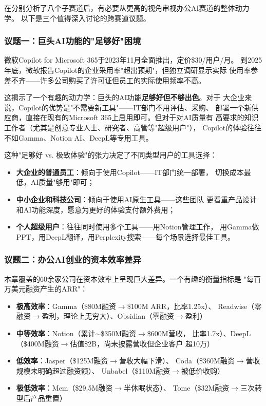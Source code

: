 在分别分析了八个子赛道后，有必要从更高的视角审视办公AI赛道的整体动力学。
以下是三个值得深入讨论的跨赛道议题。

\subsubsection{议题一：巨头AI功能的"足够好"困境}
微软Copilot for Microsoft 365于2023年11月全面推出，定价\$30/用户/月。
到2025年底，微软报告Copilot的企业采用率"超出预期"，但独立调研显示实际
使用率参差不齐——许多公司购买了许可证但员工的实际使用频率不高。

这揭示了一个有趣的动力学：巨头的AI功能\textbf{足够好但不够出色}。对于
大企业来说，Copilot的优势是"不需要新工具"——IT部门不用评估、采购、
部署一个新供应商，直接在现有的Microsoft 365上启用即可。但对于对AI质量有
高要求的知识工作者（尤其是创意专业人士、研究者、高管等"超级用户"），
Copilot的体验往往不如Gamma、Notion AI、DeepL等专用工具。

这种"足够好 vs. 极致体验"的张力决定了不同类型用户的工具选择：
\begin{itemize}
  \item \textbf{大企业的普通员工}：倾向于使用Copilot——IT部门统一部署，
    切换成本最低，AI质量"够用"即可；
  \item \textbf{中小企业和科技公司}：倾向于使用AI原生工具——这些团队
    更看重产品设计和AI功能深度，愿意为更好的体验支付额外费用；
  \item \textbf{个人超级用户}：往往同时使用多个工具——用Notion管理工作，
    用Gamma做PPT，用DeepL翻译，用Perplexity搜索——每个场景选择最佳工具。
\end{itemize}

\subsubsection{议题二：办公AI创业的资本效率差异}
本章覆盖的60余家公司在资本效率上呈现巨大差异。一个有趣的衡量指标是
"每百万美元融资产生的ARR"：

\begin{itemize}
  \item \textbf{极高效率}：Gamma（\$80M融资$\to$\$100M ARR，比率1.25x）、
    Readwise（零融资$\to$盈利，理论上无穷大）、Obsidian（零融资$\to$盈利）
  \item \textbf{中等效率}：Notion（累计$\sim$\$350M融资$\to$\$600M营收，
    比率1.7x）、DeepL（\$400M融资$\to$估值\$2B，尚未披露营收但企业客户
    超10万）
  \item \textbf{低效率}：Jasper（\$125M融资$\to$营收大幅下滑）、
    Coda（\$360M融资$\to$营收规模未明确超过融资额）、
    Unbabel（\$110M融资$\to$被低价收购）
  \item \textbf{极低效率}：Mem（\$29.5M融资$\to$半休眠状态）、
    Tome（\$32M融资$\to$三次转型后产品重置）
\end{itemize}

